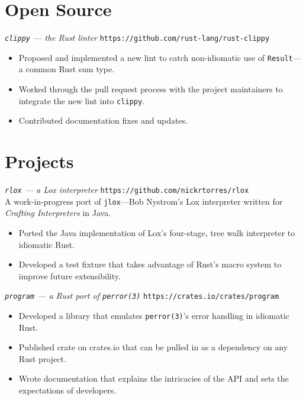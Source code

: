 \documentclass[margin]{res}
\begin{document}
\begin{resume}
\section{Open Source}
              {\sl \texttt{clippy} --- the Rust linter} \hfill \texttt{https://github.com/rust-lang/rust-clippy}
                 \begin{itemize}
                   \item Proposed and implemented a new lint to catch non-idiomatic use of
                   \texttt{Result}---a common Rust sum type.
                   \item Worked through the pull request process with the
                   project maintainers to integrate the new lint into
                   \texttt{clippy}.
                   \item Contributed documentation fixes and updates.
                 \end{itemize}
\section{Projects}
             {\sl \texttt{rlox} --- a Lox interpreter} \hfill \texttt{https://github.com/nickrtorres/rlox} \\
             A work-in-progress port of \texttt{jlox}---Bob Nystrom's Lox interpreter
             written for {\sl Crafting Interpreters} in Java.
                 \begin{itemize}
                   \item Ported the Java implementation of Lox's four-stage,
                   tree walk interpreter to idiomatic Rust.
                   \item Developed a test fixture that takes advantage of
                   Rust's macro system to improve future extensibility.
                 \end{itemize}

             {\sl \texttt{program} --- a Rust port of \texttt{perror(3)}} \hfill \texttt{https://crates.io/crates/program}
                 \begin{itemize}
                   \item Developed a library that emulates \texttt{perror(3)}'s
                   error handling in idiomatic Rust.
                   \item Published crate on crates.io that can be pulled in as
                   a dependency on any Rust project.
                   \item Wrote documentation that explains the intricacies of
                   the API and sets the expectations of developers.
                 \end{itemize}
\end{resume}
\end{document}
